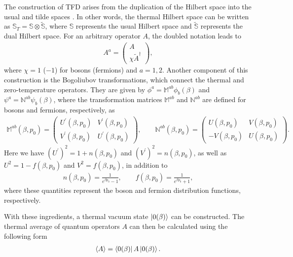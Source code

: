 \documentclass[11pt,showpacs,preprintnumbers,amsmath,amssymb,prd,nofootinbib,superscriptaddress]{revtex4-2}
\begin{document}
The construction of TFD arises from the duplication of the Hilbert space into the usual and tilde spaces \cite{temp000, khannatfd, scatter2, santos2022temperature, santos2016quantized,santos2019thermal}. In other words, the thermal Hilbert space can be written as \(\mathbb{S}_T = \mathbb{S} \otimes \tilde{\mathbb{S}}\), where \(\mathbb{S}\) represents the usual Hilbert space and \(\tilde{\mathbb{S}}\) represents the dual Hilbert space. For an arbitrary operator $A$, the doubled notation leads to
\begin{eqnarray}
    A^a=\begin{pmatrix}
    A\\\chi\tilde{A}^\dagger
    \end{pmatrix},
\end{eqnarray}
where $\chi=1$ ($-1$) for bosons (fermions) and $a=1,2$. Another component of this construction is the Bogoliubov transformations, which connect the thermal and zero-temperature operators. They are given by $\phi^a=\mathbb{M}^{ab}\phi_b(\beta)$ and $\psi^a=\mathbb{N}^{ab}\psi_b(\beta)$, where the transformation matrices  $\mathbb{M}^{ab}$ and $\mathbb{N}^{ab}$  are defined for bosons and fermions, respectively, as
\begin{eqnarray}
    \mathbb{M}^{ab}(\beta,p_0)=\begin{pmatrix}
        U^\prime(\beta,p_0) & V^\prime(\beta,p_0) \\
        V^\prime(\beta,p_0) & U^\prime(\beta,p_0)
    \end{pmatrix},\quad\quad \mathbb{N}^{ab}(\beta,p_0)=\begin{pmatrix}
        U(\beta,p_0) & V(\beta,p_0) \\
        -V(\beta,p_0) & U(\beta,p_0)
    \end{pmatrix}.\label{eq20}
\end{eqnarray}
Here we have $(U^\prime)^2=1+n(\beta,p_0)$ and $(V^\prime)^2=n(\beta,p_0)$,  as well as $U^2=1-f(\beta,p_0)$ and $V^2=f(\beta,p_0)$, in addition to
\begin{eqnarray}
    n(\beta,p_0)=\frac{1}{e^{\beta p_0}-1},\quad\quad f(\beta,p_0)=\frac{1}{e^{\beta p_0}+1},
\end{eqnarray}
where these quantities represent the boson and fermion distribution functions, respectively. 

With these ingredients, a thermal vacuum state $\ket{0(\beta)}$ can be constructed. The thermal average of quantum operators $A$ can then be calculated using the following form
\begin{eqnarray}
    \langle A\rangle=\bra{0(\beta)}A\ket{0(\beta)}.
\end{eqnarray}
\end{document}
